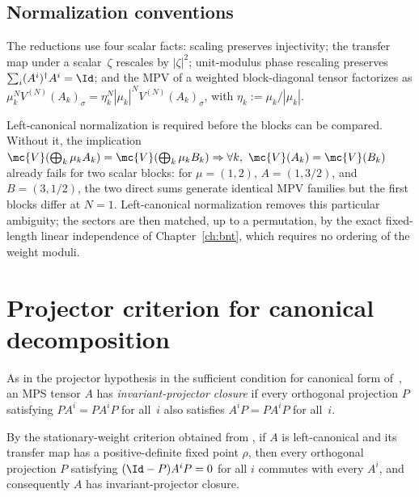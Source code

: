 \subsection{Normalization conventions}\label{sec:transfer_map_normalization}

\begin{remark}
    The reductions use four scalar facts: scaling preserves injectivity; the
    transfer map under a scalar~$\zeta$ rescales by $|\zeta|^2$; unit-modulus
    phase rescaling preserves $\sum_i(A^i)^\dagger A^i=\Id$; and the MPV of a
    weighted block-diagonal tensor factorizes as
    $\mu_k^NV^{(N)}(A_k)_\sigma
        =\eta_k^N|\mu_k|^NV^{(N)}(A_k)_\sigma$, with
    $\eta_k:=\mu_k/|\mu_k|$.

    Left-canonical normalization is required before the blocks can be compared.
    Without it, the implication
    $\mc{V}(\bigoplus_k\mu_kA_k)=\mc{V}(\bigoplus_k\mu_kB_k)
        \Rightarrow\forall k,\ \mc{V}(A_k)=\mc{V}(B_k)$
    already fails for two scalar blocks: for $\mu=(1,2)$, $A=(1,3/2)$, and
    $B=(3,1/2)$, the two direct sums generate identical MPV families but the
    first blocks differ at $N=1$. Left-canonical normalization removes this
    particular ambiguity; the sectors are then matched, up to a permutation,
    by the exact fixed-length linear independence of Chapter~\ref{ch:bnt},
    which requires no ordering of the weight moduli.
\end{remark}

\section{Projector criterion for canonical decomposition}

\begin{definition}
    \label{def:invariant_projector_closure}
    \leanok
    As in the projector hypothesis in the sufficient condition for canonical
    form of~\cite[Section~2]{Cirac2016MPDO_arXiv}, an MPS tensor $A$ has
    \emph{invariant-projector closure} if every orthogonal projection $P$
    satisfying $PA^i=PA^iP$ for all~$i$ also satisfies $A^iP=PA^iP$ for
    all~$i$.
\end{definition}


\begin{lemma}
    \label{thm:faithful_stationary_projector_closure}
    \leanok
    By the stationary-weight criterion obtained from
    \cite[Proposition~6.11 and Theorem~6.13]{Wolf2012Quantum}, if $A$ is
    left-canonical and its transfer map has a positive-definite fixed point
    $\rho$, then every orthogonal projection $P$ satisfying
    $(\Id-P)A^iP=0$ for all $i$ commutes with every $A^i$, and consequently
    $A$ has invariant-projector closure.
\end{lemma}

